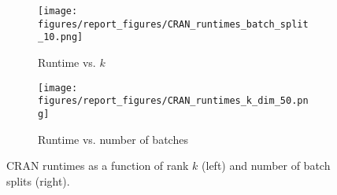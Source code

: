 \begin{figure}[h]
  \centering
  \begin{subfigure}[b]{0.4\textwidth}
    \centering
    \texttt{[image: figures/report\_figures/CRAN\_runtimes\_batch\_split\_10.png]}
    \caption{Runtime vs. $k$}
  \end{subfigure}
  \begin{subfigure}[b]{0.4\textwidth}
    \centering
    \texttt{[image: figures/report\_figures/CRAN\_runtimes\_k\_dim\_50.png]}
    \caption{Runtime vs. number of batches}
  \end{subfigure}
  \caption{CRAN runtimes as a function of rank $k$ (left) and number of batch splits (right).}
  \label{fig:cran_runtime}
\end{figure}